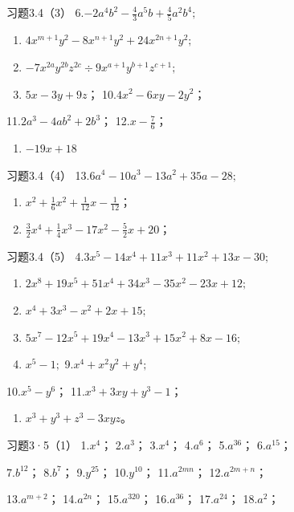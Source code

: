 习题3.4（3） 6.\(-2a^{4}b^{2}-\frac{4}{3}a^{5}b+\frac{4}{5}a^{2}b^{4};\)

\begin{enumerate}[start=7]
\item
  \(4x^{m + 1}y^{2} - 8x^{n + 1}y^{2} + 24x^{2n + 1}y^{2};\)
\item
  \(-7x^{2a}y^{2b}z^{2c}\div 9x^{a + 1}y^{b + 1}z^{c + 1};\)
\item
  \(5x - 3y + 9z\)； 10.\(4x^{2} - 6xy - 2y^{2}\)；
\end{enumerate}
11.\(2a^{3} - 4ab^{2} + 2b^{3}\)； 12.\(x - \frac{7}{6}\)；

\begin{enumerate}[start=13]
\item
  \(-19x + 18\)
\end{enumerate}

习题3.4（4） 13.\(6a^{4} - 10a^{3} - 13a^{2} + 35a - 28;\)
\begin{enumerate}[start=14]
\item
  \(x^{2} + \frac{1}{6} x^{2} + \frac{1}{12} x - \frac{1}{12}\)；
\item
  \(\frac{3}{2} x^{4} + \frac{1}{4} x^{3} - 17x^{2} - \frac{5}{2} x + 20\)；
\end{enumerate}

习题3.4（5） 4.\(3x^{5} - 14x^{4} + 11x^{3} + 11x^{2} + 13x - 30;\)

\begin{enumerate}[start=5]
\item
  \(2x^{8} + 19x^{5} + 51x^{4} + 34x^{3} - 35x^{2} - 23x + 12;\)
\item
  \(x^{4} + 3x^{3} - x^{2} + 2x + 15;\)
\item
  \(5x^{7} - 12x^{5} + 19x^{4} - 13x^{3} + 15x^{2} + 8x - 16;\)
\item
  \(x^{5} - 1;\) 9.\(x^{4} + x^{2}y^{2} + y^{4};\)
\end{enumerate}

10.\(x^{5} - y^{6}\)； 11.\(x^{3} + 3xy + y^{3} - 1\)；
\begin{enumerate}[start=12]
\item
  \(x^{3} + y^{3} + z^{3} - 3xyz\)。
\end{enumerate}

习题3·5（1） 1.\(x^4\)； 2.\(a^3\)； 3.\(x^4\)； 4.\(a^6\)；
5.\(a^{36}\)； 6.\(a^{15}\)；

7.\(b^{12}\)； 8.\(b^7\)； 9.\(y^{25}\)； 10.\(y^{10}\)；
11.\(a^{2mn}\)； 12.\(a^{2m+n}\)；

13.\(a^{m+2}\)； 14.\(a^{2n}\)； 15.\(a^{320}\)； 16.\(a^{36}\)；
17.\(a^{24}\)； 18.\(a^2\)；

